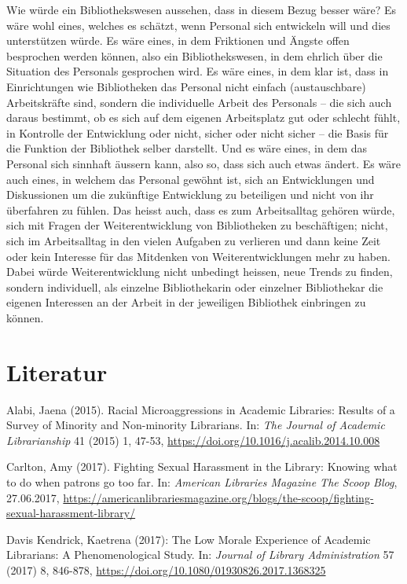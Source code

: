 \documentclass[a4paper,
fontsize=11pt,
oneside,
numbers=noperiodatend,
parskip=half-,
bibliography=totoc,
final
]{scrartcl}
\begin{document}
Wie würde ein Bibliothekswesen aussehen, dass in diesem Bezug besser
wäre? Es wäre wohl eines, welches es schätzt, wenn Personal sich
entwickeln will und dies unterstützen würde. Es wäre eines, in dem
Friktionen und Ängste offen besprochen werden können, also ein
Bibliothekswesen, in dem ehrlich über die Situation des Personals
gesprochen wird. Es wäre eines, in dem klar ist, dass in Einrichtungen
wie Bibliotheken das Personal nicht einfach (austauschbare)
Arbeitskräfte sind, sondern die individuelle Arbeit des Personals -- die
sich auch daraus bestimmt, ob es sich auf dem eigenen Arbeitsplatz gut
oder schlecht fühlt, in Kontrolle der Entwicklung oder nicht, sicher
oder nicht sicher -- die Basis für die Funktion der Bibliothek selber
darstellt. Und es wäre eines, in dem das Personal sich sinnhaft äussern
kann, also so, dass sich auch etwas ändert. Es wäre auch eines, in
welchem das Personal gewöhnt ist, sich an Entwicklungen und Diskussionen
um die zukünftige Entwicklung zu beteiligen und nicht von ihr überfahren
zu fühlen. Das heisst auch, dass es zum Arbeitsalltag gehören würde,
sich mit Fragen der Weiterentwicklung von Bibliotheken zu beschäftigen;
nicht, sich im Arbeitsalltag in den vielen Aufgaben zu verlieren und
dann keine Zeit oder kein Interesse für das Mitdenken von
Weiterentwicklungen mehr zu haben. Dabei würde Weiterentwicklung nicht
unbedingt heissen, neue Trends zu finden, sondern individuell, als
einzelne Bibliothekarin oder einzelner Bibliothekar die eigenen
Interessen an der Arbeit in der jeweiligen Bibliothek einbringen zu
können.

\hypertarget{literatur}{%
\section*{Literatur}\label{literatur}}

Alabi, Jaena (2015). Racial Microaggressions in Academic Libraries:
Results of a Survey of Minority and Non-minority Librarians. In:
\emph{The Journal of Academic Librarianship} 41 (2015) 1, 47-53,
\url{https://doi.org/10.1016/j.acalib.2014.10.008}

Carlton, Amy (2017). Fighting Sexual Harassment in the Library: Knowing
what to do when patrons go too far. In: \emph{American Libraries
Magazine The Scoop Blog}, 27.06.2017,
\url{https://americanlibrariesmagazine.org/blogs/the-scoop/fighting-sexual-harassment-library/}

Davis Kendrick, Kaetrena (2017): The Low Morale Experience of Academic
Librarians: A Phenomenological Study. In: \emph{Journal of Library
Administration} 57 (2017) 8, 846-878,
\url{https://doi.org/10.1080/01930826.2017.1368325}
\end{document}
